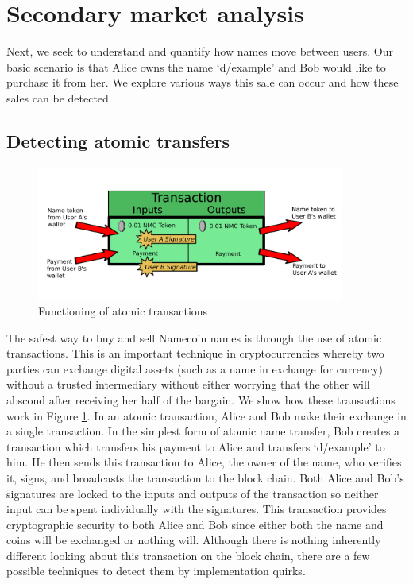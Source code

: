 \section{Secondary market analysis}
\label{sec:methods}
Next, we seek to understand and quantify how names move between users. Our basic scenario is that Alice owns the name `d/example' and Bob would like to purchase it from her. We explore various ways this sale can occur and how these sales can be detected.

\subsection{Detecting atomic transfers}

\begin{figure}
  \centering
  \includegraphics[width=0.9\textwidth]{figures/atomicTX}
  \caption{Functioning of atomic transactions}
  \label{fig:atomic}
\end{figure}

The safest way to buy and sell Namecoin names is through the use of atomic transactions. This is an important technique in cryptocurrencies whereby two parties can exchange digital assets (such as a name in exchange for currency) without a trusted intermediary without either worrying that the other will abscond after receiving her half of the bargain. We show how these transactions work in Figure \ref{fig:atomic}. In an atomic transaction, Alice and Bob make their exchange in a single transaction. In the simplest form of atomic name transfer, Bob creates a transaction which transfers his payment to Alice and transfers `d/example' to him. He then sends this transaction to Alice, the owner of the name, who verifies it, signs, and broadcasts the transaction to the block chain. Both Alice and Bob's signatures are locked to the inputs and outputs of the transaction so neither input can be spent individually with the signatures. This transaction provides cryptographic security to both Alice and Bob since either both the name and coins will be exchanged or nothing will. Although there is nothing inherently different looking about this transaction on the block chain, there are a few possible techniques to detect them by implementation quirks.

